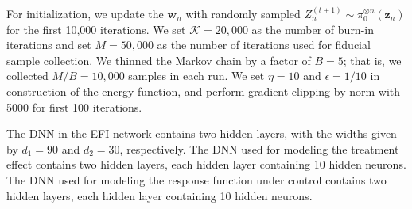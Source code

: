 \documentclass[11pt]{article}
\newcommand{\bz}{{\boldsymbol z}}
\newcommand{\bw}{{\boldsymbol w}}
\newcommand{\mK}{\mathcal{K}}
\begin{document}
 For initialization, we update the $\bw_n$ with randomly sampled $Z_n^{(t+1)}\sim \pi_0^{\otimes n}(\bz_n)$ for the first 10,000 iterations.  We set $\mK=20,000$ as the number of burn-in iterations and set $M=50,000$ as the number of iterations used for fiducial sample collection. We thinned the Markov chain by a factor of $B=5$; that is, we collected $M/B=10,000$ samples in each run. We set $\eta=10$ and $\epsilon=1/10$ in construction of the energy function, and perform gradient clipping by norm with 5000 for first 100 iterations. 


 The DNN in the EFI network contains two hidden layers,  with the widths given by $d_1=90$ and $d_2=30$, respectively. The DNN used for modeling the treatment effect contains two hidden layers,  each hidden layer 
 containing 10 hidden neurons. 
 The DNN used for modeling the response function under control contains two hidden layers, each hidden layer 
 containing 10 hidden neurons. 






 





 


\end{document}
